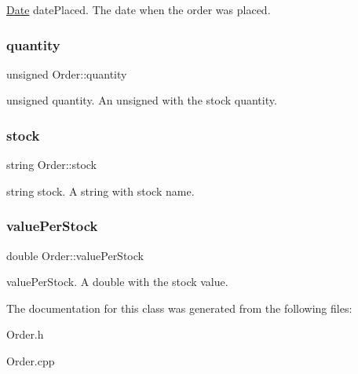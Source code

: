 \hyperlink{class_date}{Date} date\+Placed. The date when the order was placed. \hypertarget{class_order_ab02e2baeb8c57217a20c9124df3ba11d}{}\label{class_order_ab02e2baeb8c57217a20c9124df3ba11d} 
\subsubsection{\texorpdfstring{quantity}{quantity}}
{\footnotesize\ttfamily unsigned Order\+::quantity\hspace{0.3cm}{\ttfamily [protected]}}

unsigned quantity. An unsigned with the stock quantity. \hypertarget{class_order_aafb6dfab2a1c253eefd78840b27dcd2e}{}\label{class_order_aafb6dfab2a1c253eefd78840b27dcd2e} 
\subsubsection{\texorpdfstring{stock}{stock}}
{\footnotesize\ttfamily string Order\+::stock\hspace{0.3cm}{\ttfamily [protected]}}

string stock. A string with stock name. \hypertarget{class_order_ab5d512fb35483413b9fe200d58324c2e}{}\label{class_order_ab5d512fb35483413b9fe200d58324c2e} 
\subsubsection{\texorpdfstring{value\+Per\+Stock}{valuePerStock}}
{\footnotesize\ttfamily double Order\+::value\+Per\+Stock\hspace{0.3cm}{\ttfamily [protected]}}

value\+Per\+Stock. A double with the stock value. 

The documentation for this class was generated from the following files\+:\begin{DoxyCompactItemize}
\item 
Order.\+h\item 
Order.\+cpp\end{DoxyCompactItemize}
